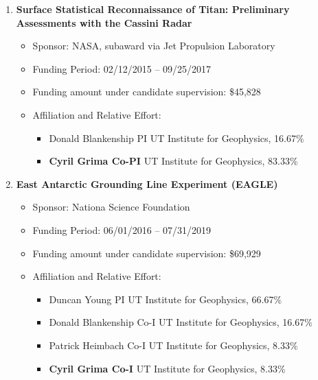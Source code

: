 \begin{enumerate}[leftmargin=2.5em, labelsep=1.5em, label=E\arabic*]

    \item
        \textbf{Surface Statistical Reconnaissance of Titan: Preliminary Assessments with the Cassini Radar}
        \begin{itemize}[leftmargin=0em, labelsep=1em, topsep=-.5em, itemsep=-.2em]
            \item Sponsor: NASA, subaward via Jet Propulsion Laboratory
            \item Funding Period: 02/12/2015 – 09/25/2017
            \item Funding amount under candidate supervision: \$45,828
            \item Affiliation and Relative Effort:
            \TabPositions{4cm, 5.5cm}
            \begin{itemize}[leftmargin=2em, labelsep=1em, topsep=-.5em, itemsep=-.2em]
                \item Donald Blankenship \tab PI \tab UT Institute for Geophysics, 16.67\%
                \item \textbf{Cyril Grima \tab Co-PI} \tab  UT Institute for Geophysics, 83.33\%
            \end{itemize}
        \end{itemize}

    \item
        \textbf{East Antarctic Grounding Line Experiment (EAGLE)}
        \begin{itemize}[leftmargin=0em, labelsep=1em, topsep=-.5em, itemsep=-.2em]
            \item Sponsor: Nationa Science Foundation
            \item Funding Period: 06/01/2016 – 07/31/2019
            \item Funding amount under candidate supervision: \$69,929
            \item Affiliation and Relative Effort:
            \TabPositions{4cm, 5.5cm}
            \begin{itemize}[leftmargin=2em, labelsep=1em, topsep=-.5em, itemsep=-.2em]
                \item Duncan Young \tab PI \tab UT Institute for Geophysics, 66.67\%
                \item Donald Blankenship \tab Co-I \tab UT Institute for Geophysics, 16.67\%
                \item Patrick Heimbach \tab Co-I \tab UT Institute for Geophysics, 8.33\%
                \item \textbf{Cyril Grima \tab Co-I} \tab  UT Institute for Geophysics, 8.33\%
            \end{itemize}
        \end{itemize}


\end{enumerate}
